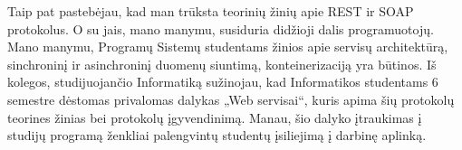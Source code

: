Taip pat pastebėjau, kad man trūksta teorinių žinių apie REST ir SOAP protokolus. O su jais, mano manymu, susiduria didžioji dalis programuotojų.
Mano manymu, Programų Sistemų studentams žinios apie servisų architektūrą, sinchroninį ir asinchroninį duomenų siuntimą, konteinerizaciją yra būtinos.
Iš kolegos, studijuojančio Informatiką sužinojau, kad Informatikos studentams 6 semestre dėstomas privalomas dalykas „Web servisai“,
kuris apima šių protokolų teorines žinias bei protokolų įgyvendinimą. Manau, šio dalyko įtraukimas į studijų programą ženkliai palengvintų studentų įsiliejimą į darbinę aplinką.

